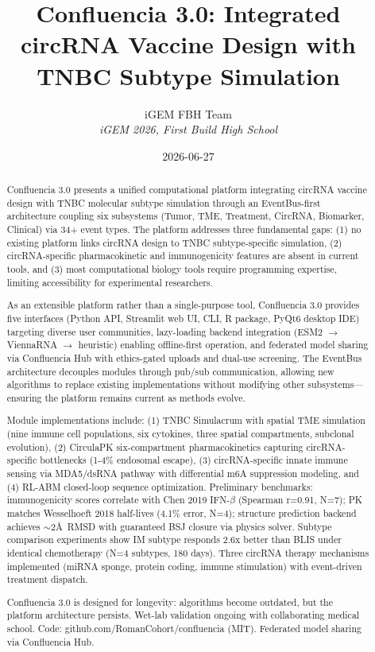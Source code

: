 \documentclass[12pt]{article}
\title{Confluencia 3.0: Integrated circRNA Vaccine Design with TNBC Subtype Simulation}
\author{
iGEM FBH Team\\
\textit{iGEM 2026, First Build High School}
}
\date{2026-06-27}
\begin{document}
\maketitle

\begin{abstract}
Confluencia 3.0 presents a unified computational platform integrating circRNA vaccine design with TNBC molecular subtype simulation through an EventBus-first architecture coupling six subsystems (Tumor, TME, Treatment, CircRNA, Biomarker, Clinical) via 34+ event types. The platform addresses three fundamental gaps: (1) no existing platform links circRNA design to TNBC subtype-specific simulation, (2) circRNA-specific pharmacokinetic and immunogenicity features are absent in current tools, and (3) most computational biology tools require programming expertise, limiting accessibility for experimental researchers.

As an extensible platform rather than a single-purpose tool, Confluencia 3.0 provides five interfaces (Python API, Streamlit web UI, CLI, R package, PyQt6 desktop IDE) targeting diverse user communities, lazy-loading backend integration (ESM2 $\rightarrow$ ViennaRNA $\rightarrow$ heuristic) enabling offline-first operation, and federated model sharing via Confluencia Hub with ethics-gated uploads and dual-use screening. The EventBus architecture decouples modules through pub/sub communication, allowing new algorithms to replace existing implementations without modifying other subsystems—ensuring the platform remains current as methods evolve.

Module implementations include: (1) TNBC Simulacrum with spatial TME simulation (nine immune cell populations, six cytokines, three spatial compartments, subclonal evolution), (2) CirculaPK six-compartment pharmacokinetics capturing circRNA-specific bottlenecks (1-4\% endosomal escape), (3) circRNA-specific innate immune sensing via MDA5/dsRNA pathway with differential m6A suppression modeling, and (4) RL-ABM closed-loop sequence optimization. Preliminary benchmarks: immunogenicity scores correlate with Chen 2019 IFN-$\beta$ (Spearman r=0.91, N=7); PK matches Wesselhoeft 2018 half-lives (4.1\% error, N=4); structure prediction backend achieves $\sim$2\AA\ RMSD with guaranteed BSJ closure via physics solver. Subtype comparison experiments show IM subtype responds 2.6x better than BLIS under identical chemotherapy (N=4 subtypes, 180 days). Three circRNA therapy mechanisms implemented (miRNA sponge, protein coding, immune stimulation) with event-driven treatment dispatch.

Confluencia 3.0 is designed for longevity: algorithms become outdated, but the platform architecture persists. Wet-lab validation ongoing with collaborating medical school. Code: github.com/RomanCohort/confluencia (MIT). Federated model sharing via Confluencia Hub.
\end{abstract}
\end{document}
